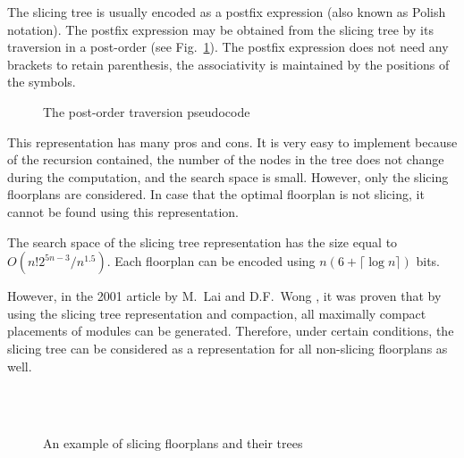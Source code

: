 The slicing tree is usually encoded as a postfix expression (also known as Polish notation). The postfix expression may be obtained from the slicing tree by its traversion in a post-order (see Fig.~\ref{fig:postorder}). The postfix expression does not need any brackets to retain parenthesis, the associativity is maintained by the positions of the symbols. 

\begin{figure}
\centering
\begin{algorithmic}[1]
\end{algorithmic}
\caption{The post-order traversion pseudocode}
\label{fig:postorder}
\end{figure}

This representation has many pros and cons. It is very easy to implement because of the recursion contained, the number of the nodes in the tree does not change during the computation, and the search space is small. However, only the slicing floorplans are considered. In case that the optimal floorplan is not slicing, it cannot be found using this representation.

The search space of the slicing tree representation \cite{otree} has the size equal to $O(n!2^{5n-3}/n^{1.5})$. Each floorplan can be encoded using $n(6+\lceil\log n\rceil)$ bits.

However, in the 2001 article by M.~Lai and D.F.~Wong \cite{pe2}, it was proven that by using the slicing tree representation and compaction, all maximally compact placements of modules can be generated. Therefore, under certain conditions, the slicing tree can be considered as a representation for all non-slicing floorplans as well.

\begin{figure}
  \centering
   \hspace{1cm}
   \\
   \hspace{1cm}
   \\
  \caption{An example of slicing floorplans and their trees}
  \label{fig:slicing}
\end{figure}


